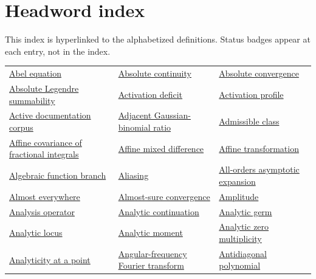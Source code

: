 \documentclass[11pt,oneside]{article}
\begin{document}
\section*{Headword index}
\small This index is hyperlinked to the alphabetized definitions.  Status badges appear at each entry, not in the index.\normalsize\par\medskip
\begingroup\footnotesize\setlength{\tabcolsep}{5pt}\renewcommand{\arraystretch}{1.10}
\begin{longtable}{L{0.31\textwidth}L{0.31\textwidth}L{0.31\textwidth}}
\hyperlink{gls:abel-equation}{Abel equation} & \hyperlink{gls:absolute-continuity}{Absolute continuity} & \hyperlink{gls:absolute-convergence}{Absolute convergence} \\
\hyperlink{gls:absolute-legendre-summability}{Absolute Legendre summability} & \hyperlink{gls:activation-deficit}{Activation deficit} & \hyperlink{gls:activation-profile}{Activation profile} \\
\hyperlink{gls:active-documentation-corpus}{Active documentation corpus} & \hyperlink{gls:gaussian-binomial-adjacent-ratio}{Adjacent Gaussian-binomial ratio} & \hyperlink{gls:admissible-class}{Admissible class} \\
\hyperlink{gls:fractional-affine-covariance}{Affine covariance of fractional integrals} & \hyperlink{gls:affine-mixed-difference}{Affine mixed difference} & \hyperlink{gls:affine-transformation}{Affine transformation} \\
\hyperlink{gls:algebraic-function-branch}{Algebraic function branch} & \hyperlink{gls:aliasing}{Aliasing} & \hyperlink{gls:all-orders-asymptotic-expansion}{All-orders asymptotic expansion} \\
\hyperlink{gls:almost-everywhere}{Almost everywhere} & \hyperlink{gls:almost-sure-convergence}{Almost-sure convergence} & \hyperlink{gls:amplitude}{Amplitude} \\
\hyperlink{gls:analysis-operator}{Analysis operator} & \hyperlink{gls:analytic-continuation}{Analytic continuation} & \hyperlink{gls:analytic-germ}{Analytic germ} \\
\hyperlink{gls:analytic-locus}{Analytic locus} & \hyperlink{gls:analytic-moment}{Analytic moment} & \hyperlink{gls:analytic-zero-multiplicity}{Analytic zero multiplicity} \\
\hyperlink{gls:analyticity-at-a-point}{Analyticity at a point} & \hyperlink{gls:angular-frequency-fourier-transform}{Angular-frequency Fourier transform} & \hyperlink{gls:antidiagonal-polynomial}{Antidiagonal polynomial} \\

\end{longtable}
\end{document}

